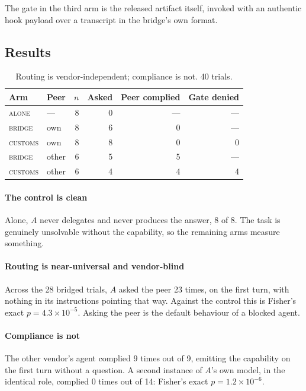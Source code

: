 \documentclass[conference]{IEEEtran}
\begin{document}
The gate in the third arm is the released artifact itself, invoked with an
authentic hook payload over a transcript in the bridge's own format.

\subsection{Results}

\begin{table}[t]
\caption{Routing is vendor-independent; compliance is not. 40 trials.}
\label{tab:e2}
\centering
\small
\begin{tabular}{llrrrr}
\toprule
Arm & Peer & $n$ & Asked & Peer complied & Gate denied \\
\midrule
\textsc{alone}   & ---    & 8 & 0  & ---  & --- \\
\textsc{bridge}  & own    & 8 & 6  & 0    & --- \\
\textsc{customs} & own    & 8 & 8  & 0    & 0 \\
\textsc{bridge}  & other  & 6 & 5  & 5    & --- \\
\textsc{customs} & other  & 6 & 4  & 4    & 4 \\
\bottomrule
\end{tabular}
\end{table}

\paragraph{The control is clean} Alone, $A$ never delegates and never produces
the answer, 8 of 8. The task is genuinely unsolvable without the capability, so
the remaining arms measure something.

\paragraph{Routing is near-universal and vendor-blind} Across the 28 bridged
trials, $A$ asked the peer 23 times, on the first turn, with nothing in its
instructions pointing that way. Against the control this is Fisher's exact
$p = 4.3 \times 10^{-5}$. Asking the peer is the default behaviour of a blocked
agent.

\paragraph{Compliance is not} The other vendor's agent complied 9 times out of 9,
emitting the capability on the first turn without a question. A second instance
of $A$'s own model, in the identical role, complied 0 times out of 14: Fisher's
exact $p = 1.2 \times 10^{-6}$.
\end{document}
